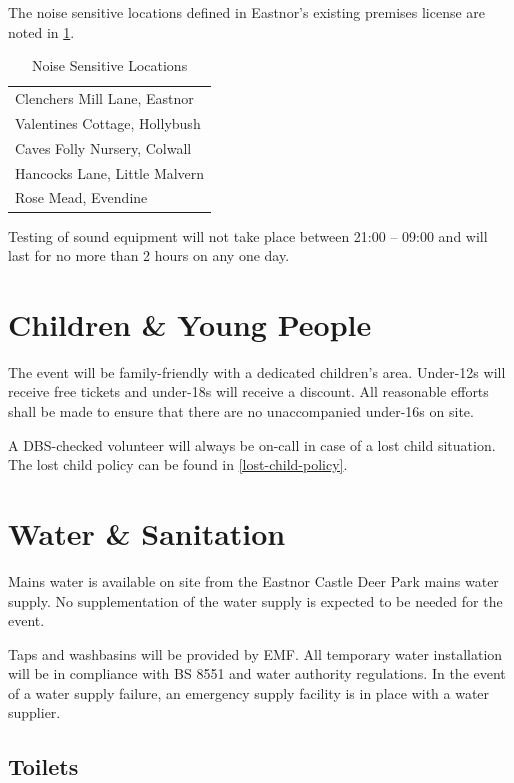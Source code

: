 The noise sensitive locations defined in Eastnor's existing premises license
are noted in \cref{table:noiselocations}.

\begin{table}[h!]
    \caption{Noise Sensitive Locations}
    \label{table:noiselocations}
    \centering
    \begin{tabular}{| l |}
        \hline
      Clenchers Mill Lane, Eastnor \\
      Valentines Cottage, Hollybush \\
      Caves Folly Nursery, Colwall \\
      Hancocks Lane, Little Malvern \\
      Rose Mead, Evendine \\
        \hline
    \end{tabular}
\end{table}

Testing of sound equipment will not take place between 21:00 -- 09:00 and
will last for no more than 2 hours on any one day.

\section{Children \& Young People}

The event will be family-friendly with a dedicated children's area. Under-12s will receive free
tickets and under-18s will receive a discount. All reasonable efforts shall be made to ensure
that there are no unaccompanied under-16s on site.

A DBS-checked volunteer will always be on-call in case of a lost child situation. The lost child
policy can be found in \cref{lost-child-policy}.

\section{Water \& Sanitation}\label{water}
Mains water is available on site from the Eastnor Castle Deer Park mains water supply. No 
supplementation of the water supply is expected to be needed for the event.

Taps and washbasins will be provided by EMF\@.
All temporary water installation will be in compliance with BS 8551 \cite{bs8551} and water authority regulations.
In the event of a water supply failure, an emergency supply facility is in place with a water supplier.

\subsection{Toilets}

